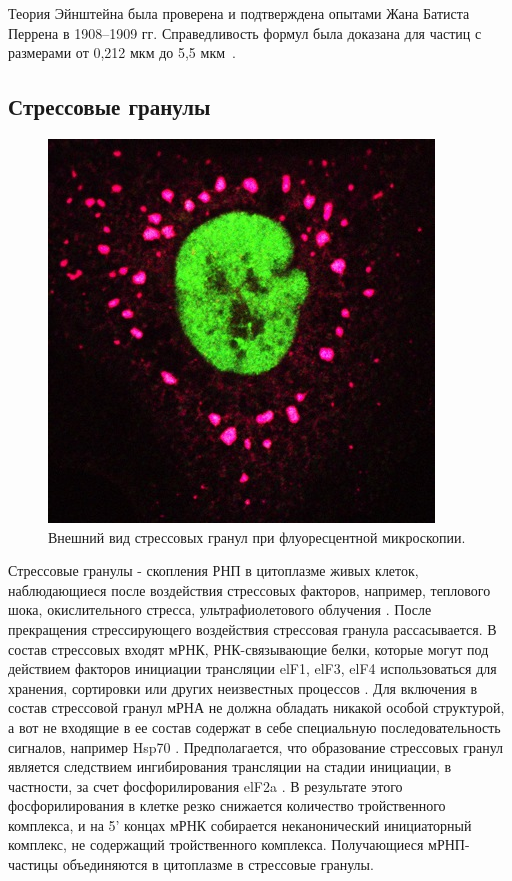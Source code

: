 \documentclass[14pt,a4paper]{extarticle}
\begin{document}
	Теория Эйнштейна была проверена и подтверждена опытами Жана Батиста Перрена в 1908--1909 гг. Справедливость формул была доказана для частиц с размерами от 0,212 мкм до 5,5 мкм~\cite{Perrin:1906ys}.



\subsection{Стрессовые гранулы}
\begin{figure}[hbt]\centering
\includegraphics[width=0.9\columnwidth]{../pics/stressgranules.jpg}
\caption{Внешний вид стрессовых гранул при флуоресцентной микроскопии.}
\label{fig:sg-content}
\end{figure}
	 Стрессовые гранулы - скопления РНП в цитоплазме живых клеток, наблюдающиеся после воздействия стрессовых факторов, например, теплового шока, окислительного стресса, ультрафиолетового облучения \cite{Kedersha27121999}. После прекращения стрессирующего воздействия стрессовая гранула рассасывается. В состав стрессовых входят мРНК, РНК-связывающие белки, которые могут под действием факторов инициации трансляции elF1, elF3, elF4 использоваться для хранения, сортировки или других неизвестных процессов \cite{Anderson:2008ys, Ivanov:2006ul}. Для включения в состав стрессовой гранул мРНА не должна обладать никакой особой структурой, а вот не входящие в ее состав содержат в себе специальную последовательность сигналов, например Hsp70 \cite{Kedersha:2002kx}. Предполагается, что образование стрессовых гранул является следствием ингибирования трансляции на стадии инициации, в частности, за счет фосфорилирования elF2a \cite{Kedersha:2002vn}. В результате этого фосфорилирования в клетке резко снижается количество тройственного комплекса, и на 5’ концах мРНК собирается неканонический инициаторный комплекс, не содержащий тройственного комплекса. Получающиеся мРНП-частицы объединяются в цитоплазме в стрессовые гранулы.
	 
\end{document}
